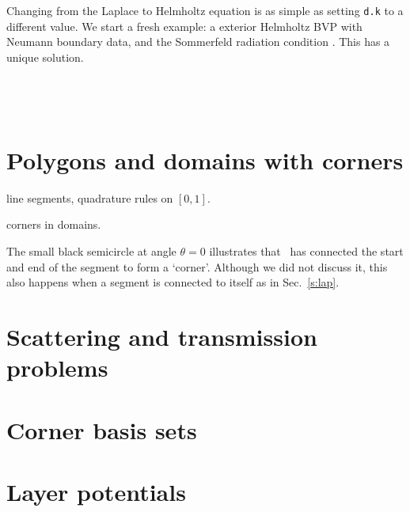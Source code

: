 \documentclass[11pt]{article}
\begin{document}
Changing from the Laplace to Helmholtz equation is as simple
as setting {\tt d.k} to a different value.
We start a fresh example: a exterior Helmholtz BVP
with Neumann boundary data, and the Sommerfeld radiation
condition \cite{coltonkress}. This has a unique solution.





\begin{verbatim}
   
\end{verbatim}

\begin{verbatim}
   
\end{verbatim}






\section{Polygons and domains with corners}

line segments, quadrature rules on $[0,1]$.

corners in domains.

The small black semicircle at angle $\theta=0$ illustrates that \mpspack\
has connected the start and end of the segment to form a `corner'.
Although we did not discuss it, this also happens when a segment
is connected to itself as in Sec.~\ref{s:lap}.



\section{Scattering and transmission problems}

\section{Corner basis sets}

\section{Layer potentials}




 

\end{document}
